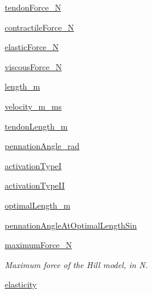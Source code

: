 \begin{DoxyCompactItemize}
\hyperlink{classjoint_ankle_position_task_1_1joint_ankle_position_task_a2a9a5ed9217c778adc027057f90ed8ba}{tendon\+Force\+\_\+N}
\item 
\hyperlink{classjoint_ankle_position_task_1_1joint_ankle_position_task_adb7a2c3b675261450a013881a0e17f35}{contractile\+Force\+\_\+N}
\item 
\hyperlink{classjoint_ankle_position_task_1_1joint_ankle_position_task_adff22684de2578136d332dc7dc8cc2be}{elastic\+Force\+\_\+N}
\item 
\hyperlink{classjoint_ankle_position_task_1_1joint_ankle_position_task_a38c0b237285d83d71db630ff35e012c1}{viscous\+Force\+\_\+N}
\item 
\hyperlink{classjoint_ankle_position_task_1_1joint_ankle_position_task_a90fb375d6639e59a126dd93c95782f0e}{length\+\_\+m}
\item 
\hyperlink{classjoint_ankle_position_task_1_1joint_ankle_position_task_afae7e739989812758153bcdc65db4e6b}{velocity\+\_\+m\+\_\+ms}
\item 
\hyperlink{classjoint_ankle_position_task_1_1joint_ankle_position_task_aba690d82e128da22af8f6ce4464a7ac1}{tendon\+Length\+\_\+m}
\item 
\hyperlink{classjoint_ankle_position_task_1_1joint_ankle_position_task_a2112adfad65bb895e4baa3e79143109b}{pennation\+Angle\+\_\+rad}
\item 
\hyperlink{classjoint_ankle_position_task_1_1joint_ankle_position_task_acee16ab376b0dc001488d450dae957a4}{activation\+TypeI}
\item 
\hyperlink{classjoint_ankle_position_task_1_1joint_ankle_position_task_a3c56e0e9ea474f09ee101fb0a37b7cad}{activation\+Type\+II}
\item 
\hyperlink{classjoint_ankle_position_task_1_1joint_ankle_position_task_a5224131e715b5a046072019fe5a14366}{optimal\+Length\+\_\+m}
\item 
\hyperlink{classjoint_ankle_position_task_1_1joint_ankle_position_task_a0877e00f062b731c365508ff7d2a3d6a}{pennation\+Angle\+At\+Optimal\+Length\+Sin}
\item 
\hyperlink{classjoint_ankle_position_task_1_1joint_ankle_position_task_a77b2e15699b1101d7ed9a2dc2ac4bff9}{maximum\+Force\+\_\+N}
\begin{DoxyCompactList}\small\item\em Maximum force of the Hill model, in N. \end{DoxyCompactList}\item 
\hyperlink{classjoint_ankle_position_task_1_1joint_ankle_position_task_ab4a33bf81b56f4153e3056226dc800b8}{elasticity}

\end{DoxyCompactItemize}
